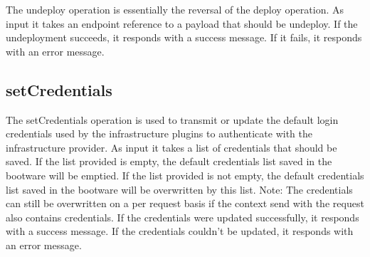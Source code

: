 The undeploy operation is essentially the reversal of the deploy operation.
As input it takes an endpoint reference to a payload that should be undeploy.
If the undeployment succeeds, it responds with a success message.
If it fails, it responds with an error message.

\subsection{setCredentials}

The setCredentials operation is used to transmit or update the default login credentials used by the infrastructure plugins to authenticate with the infrastructure provider.
As input it takes a list of credentials that should be saved.
If the list provided is empty, the default credentials list saved in the bootware will be emptied.
If the list provided is not empty, the default credentials list saved in the bootware will be overwritten by this list.
Note: The credentials can still be overwritten on a per request basis if the context send with the request also contains credentials.
If the credentials were updated successfully, it responds with a success message.
If the credentials couldn't be updated, it responds with an error message.
